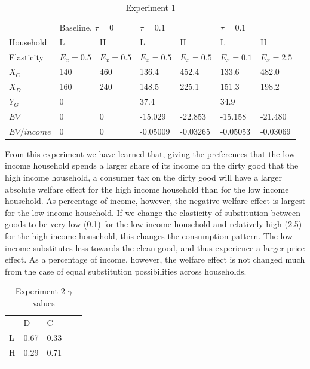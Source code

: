 \begin{table}[]
\caption{Experiment 1}
\centering
\begin{tabular}{lllllll}
            & \multicolumn{2}{l}{Baseline, $\tau=0$} & \multicolumn{2}{l}{$\tau=0.1$} & \multicolumn{2}{l}{$\tau=0.1$} \\
Household   & L                  & H                 & L              & H             & L              & H             \\
Elasticity  & $E_x=0.5$          & $E_x=0.5$         & $E_x=0.5$      & $E_x=0.5$     & $E_x=0.1$      & $E_x=2.5$     \\
$X_C$       & 140                & 460               & 136.4          & 452.4         & 133.6          & 482.0         \\
$X_D$       & 160                & 240               & 148.5          & 225.1         & 151.3          & 198.2         \\
$Y_G$       & \multicolumn{2}{l}{0}                  & \multicolumn{2}{l}{37.4}       & \multicolumn{2}{l}{34.9}       \\
$EV$        & 0                  & 0                 & -15.029        & -22.853       & -15.158        & -21.480       \\
$EV/income$ & 0                  & 0                 & -0.05009       & -0.03265      & -0.05053       & -0.03069     
\end{tabular}
\end{table}

From this experiment we have learned that, giving the preferences that the low income household spends a larger share of its income on the dirty good that the high income household, a consumer tax on the dirty good will have a larger absolute welfare effect for the high income household than for the low income household. As percentage of income, however, the negative welfare effect is largest for the low income household. If we change the elasticity of substitution between goods to be very low (0.1) for the low income household and relatively high (2.5) for the high income household, this changes the consumption pattern. The low income substitutes less towards the clean good, and thus experience a larger price effect. As a percentage of income, however, the welfare effect is not changed much from the case of equal substitution possibilities across households.

\begin{table}[]
\caption{Experiment 2 $\gamma$ values}
\centering
\begin{tabular}{lllll}
  & D    & C    &  &  \\
L & 0.67 & 0.33 &  &  \\
H & 0.29 & 0.71 &  &  \\
  &      &      &  & 
\end{tabular}
\end{table}

